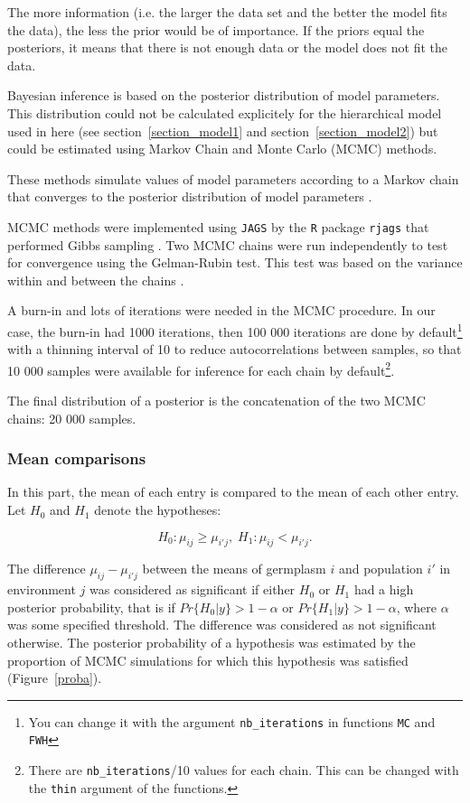 \documentclass{book}\usepackage[]{graphicx}\usepackage[]{color}
\begin{document}
The more information (i.e. the larger the data set and the better the model fits the data), the less the prior would be of importance.
If the priors equal the posteriors, it means that there is not enough data or the model does not fit the data.


Bayesian inference is based on the posterior distribution of model parameters.
This distribution could not be calculated explicitely for the hierarchical model used in here (see section~\ref{section_model1} and section~\ref{section_model2}) but could be estimated using Markov Chain and Monte Carlo (MCMC) methods.

These methods simulate values of model parameters according to a Markov chain that converges to the posterior distribution of model parameters \citep{robert_bayesian_2001}.

MCMC methods were implemented using \texttt{JAGS} by the \texttt{R} package \texttt{rjags} that performed Gibbs sampling \citep{robert_bayesian_2001}.
Two MCMC chains were run independently to test for convergence using the Gelman-Rubin test.
This test was based on the variance within and between the chains \citep{gelman_inference_1992}.

A burn-in and lots of iterations were needed in the MCMC procedure.
In our case, the burn-in had 1000 iterations, then 100 000 iterations are done by default\footnote{You can change it with the argument \texttt{nb\_iterations} in functions \texttt{MC} and \texttt{FWH}} with a thinning interval of 10 to reduce autocorrelations between samples, so that 10 000 samples were available for inference for each chain by default\footnote{There are \texttt{nb\_iterations}/10 values for each chain. This can be changed with the \texttt{thin} argument of the functions.}.

The final distribution of a posterior is the concatenation of the two MCMC chains: 20 000 samples.


\subsubsection{Mean comparisons}
\label{mean_comp}
In this part, the mean of each entry is compared to the mean of each other entry.
Let $H_{0}$ and $H_{1}$ denote the hypotheses:

\begin{displaymath}
  H_{0} : \mu_{ij} \ge \mu_{i'j} , \; H_{1} : \mu_{ij} < \mu_{i'j}.
\end{displaymath}

The difference $\mu_{ij}-\mu_{i'j}$ between the means of germplasm $i$ and population $i'$ in environment $j$ was considered as significant if either $H_{0}$ or $H_{1}$ had a high posterior probability, that is if $Pr\{H_{0}|y\} > 1 - \alpha$ or $Pr\{H_{1}|y\}> 1 - \alpha$, where
$\alpha$ was some specified threshold.
The difference was considered as not significant otherwise.
The posterior probability of a hypothesis was estimated by the proportion of MCMC simulations for
which this hypothesis was satisfied (Figure~\ref{proba}).
\end{document}
